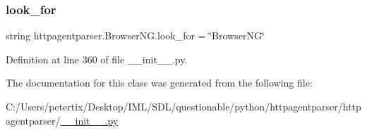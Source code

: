\subsubsection{\texorpdfstring{look\+\_\+for}{look\_for}}
{\footnotesize\ttfamily string httpagentparser.\+Browser\+N\+G.\+look\+\_\+for = \char`\"{}Browser\+NG\char`\"{}\hspace{0.3cm}{\ttfamily [static]}}



Definition at line 360 of file \+\_\+\+\_\+init\+\_\+\+\_\+.\+py.



The documentation for this class was generated from the following file\+:\begin{DoxyCompactItemize}
\item 
C\+:/\+Users/petertix/\+Desktop/\+I\+M\+L/\+S\+D\+L/questionable/python/httpagentparser/httpagentparser/\hyperlink{____init_____8py}{\+\_\+\+\_\+init\+\_\+\+\_\+.\+py}\end{DoxyCompactItemize}
